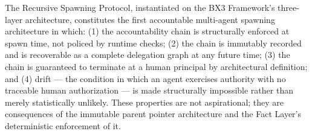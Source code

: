 The Recursive Spawning Protocol, instantiated on the BX3 Framework's three-layer architecture, constitutes the first accountable multi-agent spawning architecture in which: (1) the accountability chain is structurally enforced at spawn time, not policed by runtime checks; (2) the chain is immutably recorded and is recoverable as a complete delegation graph at any future time; (3) the chain is guaranteed to terminate at a human principal by architectural definition; and (4) drift — the condition in which an agent exercises authority with no traceable human authorization — is made structurally impossible rather than merely statistically unlikely. These properties are not aspirational; they are consequences of the immutable parent pointer architecture and the Fact Layer's deterministic enforcement of it.
